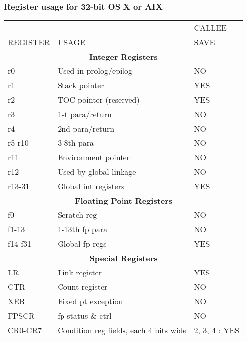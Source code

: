 \documentclass[11pt]{article}
\begin{document}
\subsubsection{Register usage for 32-bit OS X or AIX}
\begin{table}[hbt] 
\begin{center}
\begin{tabular}{||l|l|l||}\hline\hline
         &       & CALLEE\\
REGISTER & USAGE & SAVE\\\hline\hline
\multicolumn{3}{||c||}{\bf Integer Registers}\\\hline\hline
r0\footnotemark[1]
         & Used in prolog/epilog & NO \\\hline
r1       & Stack pointer         & YES \\\hline
r2       & TOC pointer (reserved)& YES \\\hline
r3       & 1st  para/return   & NO  \\\hline
r4       & 2nd  para/return   & NO  \\\hline
r5-r10   & 3-8th  para        & NO  \\\hline
r11      & Environment pointer   & NO  \\\hline
r12      & Used by global linkage& NO  \\\hline
r13-31   & Global int registers  & YES  \\\hline\hline
\multicolumn{3}{||c||}{\bf Floating Point Registers}\\\hline\hline
f0       & Scratch reg           & NO \\\hline
f1-13    & 1-13th fp para        & NO \\\hline
f14-f31  & Global fp regs        & YES \\\hline\hline
\multicolumn{3}{||c||}{\bf Special Registers}\\\hline\hline
LR       & Link register         & YES \\\hline
CTR      & Count register        & NO  \\\hline
XER      & Fixed pt exception    & NO  \\\hline
FPSCR    & fp status \& ctrl     & NO  \\\hline\hline
CR0-CR7  & Condition reg fields, each 4 bits wide & 2, 3, 4 : YES\\\hline
\end{tabular}
\end{center}
\end{table}
\end{document}
